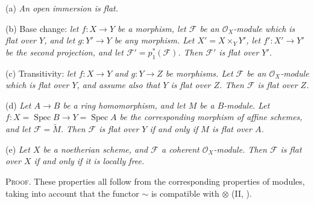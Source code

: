 {\noindent\hspace*{1.7em}\hypertarget{result-III-9.2-a}{}(a) \emph{An open immersion is flat.}

\noindent\hspace*{1.7em}\hypertarget{result-III-9.2-b}{}(b) Base change: \emph{let $f\colon X\to Y$ be a morphism, let $\mathcal F$ be an $\mathcal O_X$-module which is flat over $Y$, and let $g\colon Y'\to Y$ be any morphism. Let $X'=X\times_Y Y'$, let $f'\colon X'\to Y'$ be the second projection, and let $\mathcal F'=p_1^*(\mathcal F)$. Then $\mathcal F'$ is flat over $Y'$.}

\noindent\hspace*{1.7em}\hypertarget{result-III-9.2-c}{}(c) Transitivity: \emph{let $f\colon X\to Y$ and $g\colon Y\to Z$ be morphisms. Let $\mathcal F$ be an $\mathcal O_X$-module which is flat over $Y$, and assume also that $Y$ is flat over $Z$. Then $\mathcal F$ is flat over $Z$.}

\noindent\hspace*{1.7em}\hypertarget{result-III-9.2-d}{}(d) \emph{Let $A\to B$ be a ring homomorphism, and let $M$ be a $B$-module. Let $f\colon X=\operatorname{Spec}B\to Y=\operatorname{Spec}A$ be the corresponding morphism of affine schemes, and let $\mathcal F=\widetilde M$. Then $\mathcal F$ is flat over $Y$ if and only if $M$ is flat over $A$.}

\noindent\hspace*{1.7em}\hypertarget{result-III-9.2-e}{}(e) \emph{Let $X$ be a noetherian scheme, and $\mathcal F$ a coherent $\mathcal O_X$-module. Then $\mathcal F$ is flat over $X$ if and only if it is locally free.}

\smallskip
\noindent\textsc{Proof.} These properties all follow from the corresponding properties of modules, taking into account that the functor $\sim$ is compatible with $\otimes$ (II, ).}
